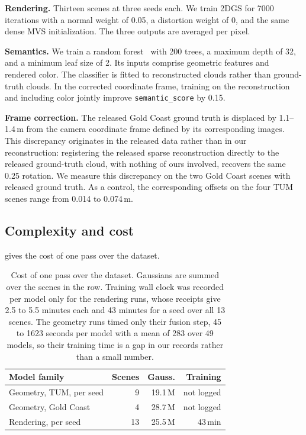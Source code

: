 \documentclass[10pt,twocolumn,letterpaper]{article}
\newcommand{\code}[1]{\texttt{\small #1}}
\newcommand{\runin}[1]{\par\smallskip\noindent\textbf{#1}\enspace}
\begin{document}
\runin{Rendering.}
Thirteen scenes at three seeds each. We train 2DGS for 7000
iterations with a normal weight of 0.05, a distortion weight of 0, and the same
dense MVS initialization. The three outputs are averaged per pixel.

\runin{Semantics.}
We train a random forest~\cite{scikit-learn} with 200 trees,
a maximum depth of 32, and a minimum leaf size of 2. Its inputs comprise
geometric features and rendered color. The classifier is fitted to reconstructed
clouds rather than ground-truth clouds. In the corrected coordinate frame,
training on the reconstruction and including color jointly improve
\code{semantic\_score} by 0.15.

\runin{Frame correction.}
The released Gold Coast ground truth is displaced by
1.1--1.4\,m from the camera coordinate frame defined by its corresponding
images. This discrepancy originates in the released data rather than in our
reconstruction: registering the released sparse reconstruction directly to the
released ground-truth cloud, with nothing of ours involved, recovers the same
0.25\textdegree{} rotation. We measure this discrepancy on the two Gold Coast
scenes with released ground truth. As a control, the corresponding offsets on
the four TUM scenes range from 0.014 to 0.074\,m.

\subsection{Complexity and cost}

 gives the cost of one pass over the dataset.

\begin{table}[h]
\centering\small
\setlength{\tabcolsep}{4pt}
\begin{tabular}{@{}lrrr@{}}
\toprule
Model family & Scenes & Gauss. & Training \\
\midrule
Geometry, TUM, per seed & 9 & 19.1\,M & not logged \\
Geometry, Gold Coast & 4 & 28.7\,M & not logged \\
Rendering, per seed & 13 & 25.5\,M & 43\,min \\
\bottomrule
\end{tabular}
\caption{Cost of one pass over the dataset. Gaussians are summed over the scenes
in the row. Training wall clock was recorded per model only for the rendering
runs, whose receipts give 2.5 to 5.5 minutes each and 43 minutes for a seed over
all 13 scenes. The geometry runs timed only their fusion step, 45 to 1623
seconds per model with a mean of 283 over 49 models, so their training time is a
gap in our records rather than a small number.}
\label{tab:cost}
\end{table}
\end{document}
